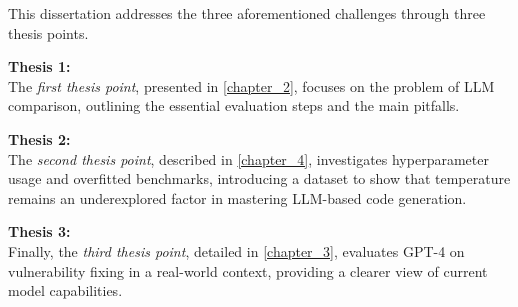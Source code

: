 This dissertation addresses the three aforementioned challenges through three thesis points.

\textbf{Thesis 1: \thesispointoneuf} 
\\
The \textit{first thesis point}, presented in \autoref{chapter_2}, focuses on the problem of LLM comparison, outlining the essential evaluation steps and the main pitfalls.
\thesisonetext

\textbf{Thesis 2: \thesispointtwouf}
\\
The \textit{second thesis point}, described in \autoref{chapter_4}, investigates hyperparameter usage and overfitted benchmarks, introducing a dataset to show that temperature remains an underexplored factor in mastering LLM-based code generation.
\thesistwotext

\textbf{Thesis 3: \thesispointthreeuf}
\\
Finally, the \textit{third thesis point}, detailed in \autoref{chapter_3}, evaluates GPT-4 on vulnerability fixing in a real-world context, providing a clearer view of current model capabilities.
\thesisthreetext

